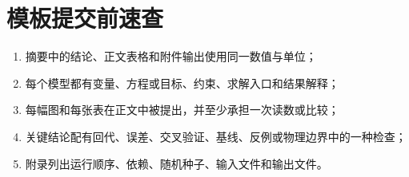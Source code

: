 \section{模板提交前速查}

\begin{enumerate}
  \item 摘要中的结论、正文表格和附件输出使用同一数值与单位；
  \item 每个模型都有变量、方程或目标、约束、求解入口和结果解释；
  \item 每幅图和每张表在正文中被提出，并至少承担一次读数或比较；
  \item 关键结论配有回代、误差、交叉验证、基线、反例或物理边界中的一种检查；
  \item 附录列出运行顺序、依赖、随机种子、输入文件和输出文件。
\end{enumerate}

